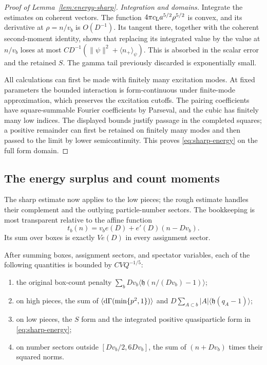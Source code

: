 \begin{proof}[Proof of Lemma~\ref{lem:energy-sharp}]
\emph{Integration and domains.}
Integrate the estimates on coherent vectors.  The function
$4\pi c_{\rm L}a^{5/2}\rho^{5/2}$ is convex, and its derivative at
$\rho=n/v_b$ is $O(D^{-1})$.  Its tangent there, together with the
coherent second-moment identity, shows that replacing its integrated
value by the value at $n/v_b$ loses at most
$CD^{-1}(\|\psi\|^2+\langle n_+\rangle_\psi)$.
This is absorbed in the scalar error and the retained $S$.
The gamma tail previously discarded is exponentially small.

All calculations can first be made with finitely many excitation modes.
At fixed parameters the bounded interaction is form-continuous under
finite-mode approximation, which preserves the excitation cutoffs.
The pairing coefficients have square-summable Fourier coefficients by
Parseval, and the cubic has finitely many low indices.  The displayed
bounds justify passage in the completed squares; a positive remainder
can first be retained on finitely many modes and then passed to the
limit by lower semicontinuity.  This proves
\eqref{eq:sharp-energy} on the full form domain.
\end{proof}

\subsection{The energy surplus and count moments}

The sharp estimate now applies to the low pieces; the rough estimate
handles their complement and the outlying particle-number sectors.
The bookkeeping is most transparent relative to the affine function
\[
                  t_b(n)=v_be(D)+e'(D)(n-Dv_b).
\]
Its sum over boxes is exactly $Ve(D)$ in every assignment sector.

\begin{lemma}
\label{lem:energy-surplus}
After summing boxes, assignment sectors, and spectator variables, each
of the following quantities is bounded by $CVQ^{-1/5}$:
\begin{enumerate}
\item the original box-count penalty
$\sum_bDv_b\langle\mathfrak h(n/(Dv_b)-1)\rangle$;
\item on high pieces, the sum of
$\langle\mathrm d\Gamma(\min\{p^2,1\})\rangle$ and
$D\sum_{A\subset b}|A|\langle\mathfrak h(q_A-1)\rangle$;
\item on low pieces, the $S$ form and the integrated positive
quasiparticle form in \eqref{eq:sharp-energy};
\item on number sectors outside $[Dv_b/2,6Dv_b]$, the sum of
$(n+Dv_b)$ times their squared norms.
\end{enumerate}
\end{lemma}

